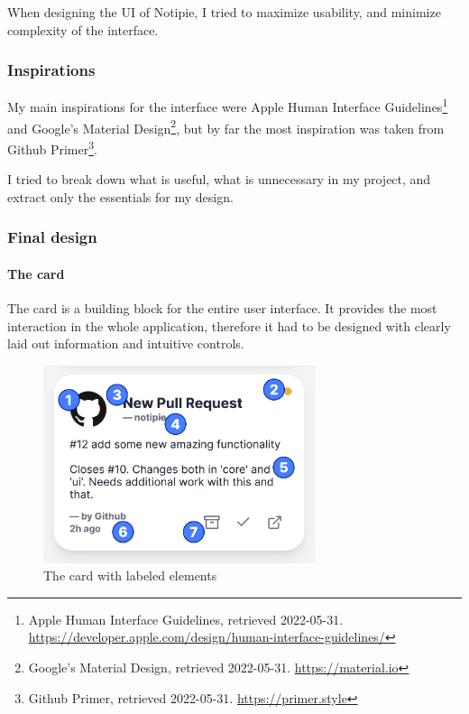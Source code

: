 When designing the UI of Notipie, I tried to maximize usability, and
minimize complexity of the interface.

\hypertarget{inspirations}{%
\subsubsection{Inspirations}\label{inspirations}}

My main inspirations for the interface were Apple Human Interface
Guidelines\footnote{Apple Human Interface Guidelines, retrieved
  2022-05-31.
  \url{https://developer.apple.com/design/human-interface-guidelines/}}
and Google's Material Design\footnote{Google's Material Design,
  retrieved 2022-05-31. \url{https://material.io}}, but by far the most
inspiration was taken from Github Primer\footnote{Github Primer,
  retrieved 2022-05-31. \url{https://primer.style}}.

I tried to break down what is useful, what is unnecessary in my project,
and extract only the essentials for my design.

\hypertarget{final-design}{%
\subsubsection{Final design}\label{final-design}}

\hypertarget{the-card}{%
\paragraph{The card}\label{the-card}}

The card is a building block for the entire user interface. It provides
the most interaction in the whole application, therefore it had to be
designed with clearly laid out information and intuitive controls.

\begin{figure}
\centering
\includegraphics[width=8cm,height=\textheight]{./img/card_labeled.png}
\caption{The card with labeled elements}
\end{figure}

